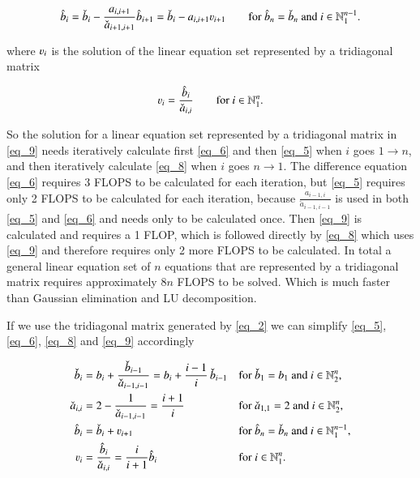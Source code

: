 \documentclass[11pt,english,a4paper]{article}
\begin{document}
\begin{flushleft}
\begin{align}
\hat b_i = \check b_i - \frac{a_{i,i+1}}{\check a_{i+1,i+1}} \hat b_{i+1} = \check b_i - a_{i,i+1} \varv_{i+1} \qquad \text{for $\hat b_n = \check b_n$ and $i\in\mathbb{N}_1^{n-1}$.}
\label{eq_8}
\end{align}

where $\varv_i$ is the solution of the linear equation set represented by a tridiagonal matrix

\begin{align}
\varv_i = \frac{\hat b_i}{\check a_{i,i}} \qquad \text{for $i\in\mathbb{N}_1^n$.}
\label{eq_9}
\end{align}

So the solution for a linear equation set represented by a tridiagonal matrix in \eqref{eq_9} needs iteratively calculate first \eqref{eq_6} and then \eqref{eq_5} when $i$ goes $1\to n$, and then iteratively calculate \eqref{eq_8} when $i$ goes $n\to 1$. The difference equation \eqref{eq_6} requires 3 FLOPS to be calculated for each iteration, but \eqref{eq_5} requires only 2 FLOPS to be calculated for each iteration, because $\frac{a_{i-1,i}}{\check a_{i-1,i-1}}$ is used in both \eqref{eq_5} and \eqref{eq_6} and needs only to be calculated once. Then \eqref{eq_9} is calculated and requires a 1 FLOP, which is followed directly by \eqref{eq_8} which uses \eqref{eq_9} and therefore requires only 2 more FLOPS to be calculated. In total a general linear equation set of $n$ equations that are represented by a tridiagonal matrix requires approximately $8n$ FLOPS to be solved. Which is much faster than Gaussian elimination and LU decomposition. \linebreak

If we use the tridiagonal matrix generated by \eqref{eq_2} we can simplify \eqref{eq_5}, \eqref{eq_6}, \eqref{eq_8} and \eqref{eq_9} accordingly

\begin{align}
\check b_i &= b_i + \frac{\check b_{i-1}}{\check a_{i-1,i-1}} = b_i + \frac{i-1}{i} \, \check b_{i-1} && \text{for $\check b_1 = b_1$ and $i\in\mathbb{N}_2^n$,} 
\label{eq_10}
\\
\check a_{i,i} &= 2 - \frac{1}{\check a_{i-1,i-1}} = \frac{i+1}{i} && \text{for $\check a_{1,1} = 2$ and $i\in\mathbb{N}_2^n$,}
\label{eq_11}
\\
\hat b_i &= \check b_i + \varv_{i+1} && \text{for $\hat b_n = \check b_n$ and $i\in \mathbb{N}_1^{n-1}$,}
\label{eq_12}
\\
\varv_i &= \frac{\hat{b}_i}{\check{a}_{i,i}} = \frac{i}{i+1}\hat b_i && \text{for $i \in \mathbb{N}_1^n$.}
\label{eq_13}
\end{align}


\end{flushleft}
\end{document}
